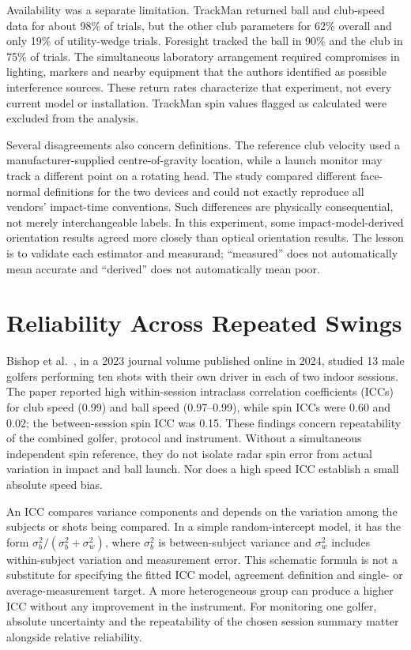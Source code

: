 Availability was a separate limitation.
TrackMan returned ball and club-speed data for about 98\% of trials, but the other club parameters for 62\% overall and only 19\% of utility-wedge trials.
Foresight tracked the ball in 90\% and the club in 75\% of trials.
The simultaneous laboratory arrangement required compromises in lighting, markers and nearby equipment that the authors identified as possible interference sources.
These return rates characterize that experiment, not every current model or installation.
TrackMan spin values flagged as calculated were excluded from the analysis.

Several disagreements also concern definitions.
The reference club velocity used a manufacturer-supplied centre-of-gravity location, while a launch monitor may track a different point on a rotating head.
The study compared different face-normal definitions for the two devices and could not exactly reproduce all vendors' impact-time conventions.
Such differences are physically consequential, not merely interchangeable labels.
In this experiment, some impact-model-derived orientation results agreed more closely than optical orientation results.
The lesson is to validate each estimator and measurand; ``measured'' does not automatically mean accurate and ``derived'' does not automatically mean poor.

\section{Reliability Across Repeated Swings}

Bishop et al.~\cite{tm4reliability}, in a 2023 journal volume published online in 2024, studied 13 male golfers performing ten shots with their own driver in each of two indoor sessions.
The paper reported high within-session intraclass correlation coefficients (ICCs) for club speed (0.99) and ball speed (0.97--0.99), while spin ICCs were 0.60 and 0.02; the between-session spin ICC was 0.15.
These findings concern repeatability of the combined golfer, protocol and instrument.
Without a simultaneous independent spin reference, they do not isolate radar spin error from actual variation in impact and ball launch.
Nor does a high speed ICC establish a small absolute speed bias.

An ICC compares variance components and depends on the variation among the subjects or shots being compared.
In a simple random-intercept model, it has the form $\sigma_b^2/(\sigma_b^2+\sigma_w^2)$, where $\sigma_b^2$ is between-subject variance and $\sigma_w^2$ includes within-subject variation and measurement error.
This schematic formula is not a substitute for specifying the fitted ICC model, agreement definition and single- or average-measurement target.
A more heterogeneous group can produce a higher ICC without any improvement in the instrument.
For monitoring one golfer, absolute uncertainty and the repeatability of the chosen session summary matter alongside relative reliability.

